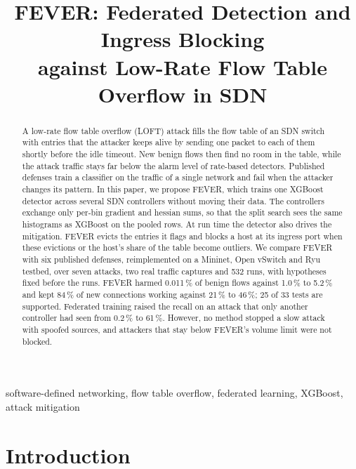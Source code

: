 \documentclass[conference]{IEEEtran}
\begin{document}
\title{FEVER: Federated Detection and Ingress Blocking\\against Low-Rate Flow Table Overflow in SDN}

\author{
}

\maketitle

\begin{abstract}
A low-rate flow table overflow (LOFT) attack fills the flow table of an SDN switch with entries that the
attacker keeps alive by sending one packet to each of them shortly before the idle timeout. New benign
flows then find no room in the table, while the attack traffic stays far below the alarm level of
rate-based detectors. Published defenses train a classifier on the traffic of a single network and fail
when the attacker changes its pattern. In this paper, we propose FEVER, which trains one XGBoost detector
across several SDN controllers without moving their data. The controllers exchange only per-bin gradient
and hessian sums, so that the split search sees the same histograms as XGBoost on the pooled rows. At run
time the detector also drives the mitigation. FEVER evicts the entries it flags and blocks a host at its
ingress port when these evictions or the host's share of the table become outliers. We compare FEVER with six published defenses, reimplemented on
a Mininet, Open vSwitch and Ryu testbed, over seven attacks, two real traffic captures and 532 runs, with
hypotheses fixed before the runs. FEVER harmed 0.011\,\% of benign flows against 1.0\,\% to 5.2\,\% and
kept 84\,\% of new connections working against 21\,\% to 46\,\%; 25 of 33 tests are supported.
Federated training raised the recall on an attack that only another controller had seen from 0.2\,\% to
61\,\%. However, no method stopped a slow attack with spoofed sources, and attackers that stay below
FEVER's volume limit were not blocked.
\end{abstract}

\begin{IEEEkeywords}
software-defined networking, flow table overflow, federated learning, XGBoost, attack mitigation
\end{IEEEkeywords}

\section{Introduction}
\end{document}
